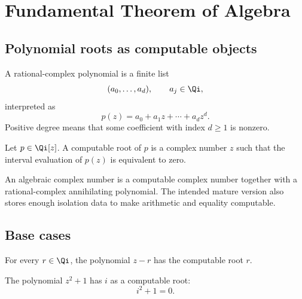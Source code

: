 \chapter{Fundamental Theorem of Algebra}

\section{Polynomial roots as computable objects}

\begin{definition}\label{def:qcomplex-poly}
A rational-complex polynomial is a finite list
\[
  (a_0,\ldots,a_d),\qquad a_j\in\Qi,
\]
interpreted as
\[
  p(z)=a_0+a_1z+\cdots+a_dz^d.
\]
Positive degree means that some coefficient with index \(d\ge 1\) is
nonzero.
\end{definition}

\begin{definition}\label{def:computable-root}
Let \(p\in\Qi[z]\).  A computable root of \(p\) is a complex number \(z\)
such that the interval evaluation of \(p(z)\) is equivalent to zero.
\end{definition}

\begin{definition}\label{def:algebraic-complex}
An algebraic complex number is a computable complex number together with a
rational-complex annihilating polynomial.  The intended mature version also
stores enough isolation data to make arithmetic and equality computable.
\end{definition}

\section{Base cases}

\begin{theorem}\label{thm:monic-linear-root}
\leanok
For every \(r\in\Qi\), the polynomial \(z-r\) has the computable root \(r\).
\end{theorem}

\begin{theorem}\label{thm:z2-plus-one-root}
\leanok
The polynomial \(z^2+1\) has \(i\) as a computable root:
\[
  i^2+1=0.
\]
\end{theorem}

